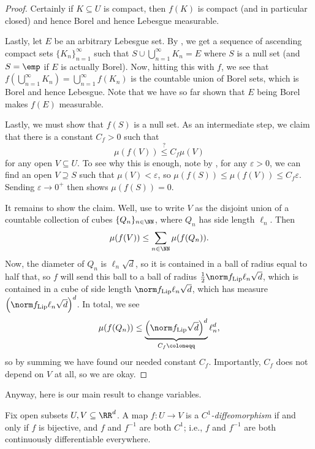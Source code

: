 \documentclass[../notes.tex]{subfiles}
\begin{document}
\begin{proof}
	Certainly if $K\subseteq U$ is compact, then $f(K)$ is compact (and in particular closed) and hence Borel and hence Lebesgue measurable. %

	Lastly, let $E$ be an arbitrary Lebesgue set. By , we get a sequence of ascending compact sets $\{K_n\}_{n=1}^\infty$ such that $S\cup\bigcup_{n=1}^\infty K_n=E$ where $S$ is a null set (and $S=\emp$ if $E$ is actually Borel). Now, hitting this with $f$, we see that $f\left(\bigcup_{n=1}^\infty K_n\right)=\bigcup_{n=1}^\infty f(K_n)$ is the countable union of Borel sets, which is Borel and hence Lebesgue. Note that we have so far shown that $E$ being Borel makes $f(E)$ measurable.

	Lastly, we must show that $f(S)$ is a null set. As an intermediate step, we claim that there is a constant $C_f>0$ such that
	\[\mu(f(V))\stackrel?\le C_f\mu(V)\]
	for any open $V\subseteq U$. To see why this is enough, note by , for any $\varepsilon>0$, we can find an open $V\supseteq S$ such that $\mu(V)<\varepsilon$, so $\mu(f(S))\le\mu(f(V))\le C_f\varepsilon$. Sending $\varepsilon\to0^+$ then shows $\mu(f(S))=0$.
	
	It remains to show the claim. Well, use  to write $V$ as the disjoint union of a countable collection of cubes $\{Q_n\}_{n\in\NN}$, where $Q_n$ has side length $\ell_n$. Then
	\[\mu(f(V))\le\sum_{n\in\NN}\mu(f(Q_n)).\]
	Now, the diameter of $Q_n$ is $\ell_n\sqrt d$, so it is contained in a ball of radius equal to half that, so $f$ will send this ball to a ball of radius $\frac12\norm f_{\mathrm{Lip}}\ell_n\sqrt d$, which is contained in a cube of side length $\norm f_{\mathrm{Lip}}\ell_n\sqrt d$, which has measure $\left(\norm f_{\mathrm{Lip}}\ell_n\sqrt d\right)^d$. In total, we see
	\[\mu(f(Q_n))\le\underbrace{\left(\norm f_{\mathrm{Lip}}\sqrt d\right)^d}_{C_f\coloneqq}\ell_n^d,\]
	so by summing we have found our needed constant $C_f$. Importantly, $C_f$ does not depend on $V$ at all, so we are okay.
\end{proof}
Anyway, here is our main result to change variables.
\begin{defihelper}[$C^1$-diffeomorphism]
	Fix open subsets $U,V\subseteq\RR^d$. A map $f\colon U\to V$ is a \textit{$C^1$-diffeo\-morphism} if and only if $f$ is bijective, and $f$ and $f^{-1}$ are both $C^1$; i.e., $f$ and $f^{-1}$ are both continuously differentiable everywhere.
\end{defihelper}
\end{document}
